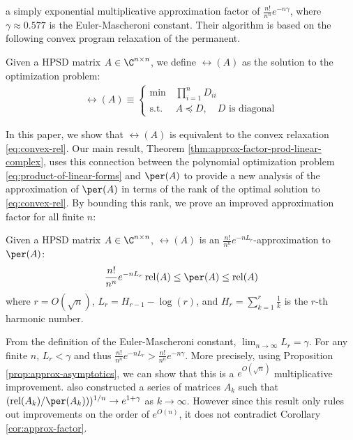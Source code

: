 a simply exponential multiplicative approximation factor of
$\frac{n!}{n^n}e^{-n\gamma}$, where $\gamma \approx 0.577$ is the
Euler-Mascheroni constant. Their algorithm is based on the following convex
program relaxation of the permanent.
\begin{definition}
  Given a HPSD matrix $A \in \C^{n \times n}$, we define $\rel(A)$ as the
  solution to the optimization problem:
  \begin{align}\label{eq:rel-opt-problem}
    \rel(A) \equiv \left\{
    \begin{array}{rl}
      \min \,& \prod_{i=1}^n D_{ii} \\
      \text{s.t.} & A \preceq D, \quad D \text{ is diagonal}
    \end{array}
                    \right.
  \end{align}
\end{definition}
In this paper, we show that $\rel(A)$ is equivalent to the convex relaxation
\eqref{eq:convex-rel}. Our main result, Theorem
\ref{thm:approx-factor-prod-linear-complex}, uses this connection between the
polynomial optimization problem \eqref{eq:product-of-linear-forms} and $\per(A)$
to provide a new analysis of the approximation of $\per(A)$ in terms of the rank
of the optimal solution to \eqref{eq:convex-rel}. By bounding this rank, we
prove an improved approximation factor for all finite $n$:
\begin{corollary} \label{cor:approx-factor} Given a HPSD matrix
  $A \in \C^{n \times n}$, $\rel(A)$ is an
  $\frac{n!}{n^n}e^{-nL_r}$-approximation to $\per(A)$:
  \begin{align*}
    \frac{n!}{n^n}e^{-nL_r} \rel(A) \le \per(A) \le \rel(A)
  \end{align*}
  where $r = O(\sqrt n)$, $L_r = H_{r-1} - \log(r)$, and
  $H_r = \sum_{k=1}^{r} \frac{1}{k}$ is the $r$-th harmonic number.
\end{corollary}
From the definition of the Euler-Mascheroni constant,
$\lim_{n \rightarrow \infty} L_r = \gamma$. For any finite $n$, $L_r < \gamma$
and thus $\frac{n!}{n^n}e^{-nL_r} > \frac{n!}{n^n}e^{-n\gamma}$. More precisely,
using Proposition \ref{prop:approx-asymptotics}, we can show that this is a
$e^{O(\sqrt n)}$ multiplicative improvement.
\cite{AnariSimplyExponentialApproximation2017a} also constructed a series of
matrices $A_k$ such that $(\rel(A_k)/\per(A_k)))^{1/n} \rightarrow e^{1+\gamma}$
as $k \rightarrow \infty$. However since this result only rules out improvements
on the order of $e^{O(n)}$, it does not contradict Corollary
\ref{cor:approx-factor}.

